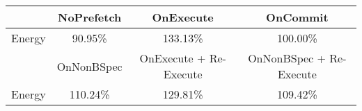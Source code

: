 \begin{tabular}{ l|ccc }
 & NoPrefetch & OnExecute & OnCommit\\ \hline
Energy
 & 90.95\% & 133.13\% & 100.00\%\\ \hline
\hline
 & OnNonBSpec & OnExecute + Re-Execute & OnNonBSpec + Re-Execute\\ \hline
Energy
 & 110.24\% & 129.81\% & 109.42\%\\ \hline
\end{tabular}

